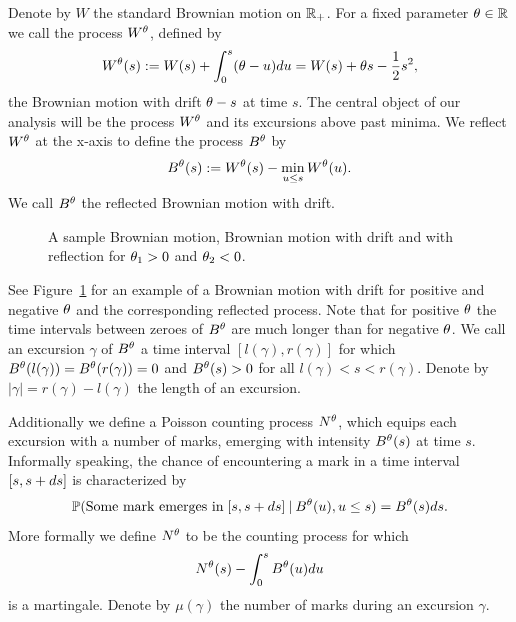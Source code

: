 Denote by $W$ the standard Brownian motion on $\mathbb{R}_+$.\label{I: bm} 
For a fixed parameter $\theta \in \mathbb{R}$ we call the process $W^{\theta}$, defined by
\begin{equation} \label{D: Wt}
	W^{\theta}(s) := W(s) + \int_{0}^{s}(\theta - u)du = W(s) + \theta s - \frac{1}{2}s^2,
\end{equation}
the Brownian motion with drift $\theta -s$ at time $s$.
The central object of our analysis will be the process $W^{\theta}$ and its excursions above past minima.
We reflect $W^{\theta}$ at the x-axis to define the process $B^{\theta}$ by
\begin{equation} \label{D: Bt}
	B^{\theta}(s) := W^{\theta}(s) - \min_{u \leq s}W^{\theta}(u).
\end{equation}
We call $B^{\theta}$ the reflected Brownian motion with drift.

\begin{figure}[h]%
	\centering
	\subfloat[$W(s)$]{}%
	\quad
	\subfloat[$W^{\pp_1}(s)$]{}%
	\quad
	\subfloat[$B^{\pp_1}(s)$]{}%
	\quad
	\subfloat[$W^{\pp_2}(s)$]{}%
	\quad
	\subfloat[$B^{\pp_2}(s)$]{}%
	\caption{A sample Brownian motion, Brownian motion with drift and with reflection for $\theta_1>0$ and $\theta_2<0$.}%
	\label{F: BM}%
\end{figure}

See Figure~\ref{F: BM} for an example of a Brownian motion with drift for positive and negative $\theta$ and the corresponding reflected process.
Note that for positive $\theta$ the time intervals between zeroes of $B^{\theta}$ are much longer than for negative $\theta$.
We call an excursion $\gamma$ of $B^{\theta}$ a time interval $[l(\gamma), r(\gamma)]$ for which $B^{\theta}(l(\gamma)) = B^{\theta}(r(\gamma)) = 0$
and $B^{\theta}(s) > 0$ for all $l(\gamma) < s < r(\gamma)$. \label{I: gamma}
Denote by $|\gamma| = r(\gamma) - l(\gamma)$ the length of an excursion. \label{I: rgammalgamma}

Additionally we define a Poisson counting process $N^{\theta}$, \label{I: nt} 
which equips each excursion with a number of marks,
emerging with intensity $B^{\theta}(s)$ at time $s$.
Informally speaking, the chance of encountering a mark in a time interval $[s, s+ds]$ is characterized by
\begin{equation}
	\mathbb{P}( \text{Some mark emerges in} \; [s, s+ds] \: | \: B^{\theta}(u), u \leq s ) = B^{\theta}(s)ds.
\end{equation}
More formally we define $N^{\theta}$ to be the counting process for which
\begin{equation}
	N^{\theta}(s) - \int_{0}^{s} B^{\theta}(u)du
\end{equation}
is a martingale.
Denote by $\mu(\gamma)$ the number of marks during an excursion $\gamma$. \label{I: mugamma}


